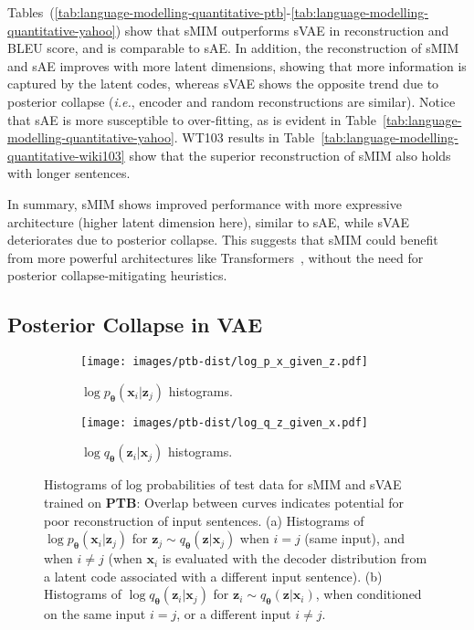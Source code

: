 \documentclass{article}
\newcommand{\bs}{\boldsymbol}
\newcommand{\ie}{{\em i.e.}}
\newcommand{\x}{{\bs{x}}}
\newcommand{\z}{{\bs z}}
\newcommand{\params}{{\bs \theta}}
\newcommand{\pdec}{p}
\newcommand{\penc}{q}
\newcommand{\Mdec}{\pdec_{\params}}
\newcommand{\Menc}{\penc_{\params}}
\begin{document}
Tables\ (\ref{tab:language-modelling-quantitative-ptb}-\ref{tab:language-modelling-quantitative-yahoo}) 
show that sMIM outperforms sVAE in reconstruction and BLEU score, and is comparable to sAE.
In addition, the reconstruction of sMIM and sAE improves with more latent dimensions, showing that more information is captured by the latent codes, 
whereas sVAE shows the opposite trend due to posterior collapse (\ie, encoder and random reconstructions are similar).
Notice that sAE is more susceptible to over-fitting, as is evident in Table\ \ref{tab:language-modelling-quantitative-yahoo}.
WT103 results in Table\ \ref{tab:language-modelling-quantitative-wiki103} show that the superior reconstruction of sMIM also holds with longer sentences.

In summary, sMIM shows improved performance with more expressive architecture (higher latent dimension here), 
similar to sAE, while sVAE deteriorates due to posterior collapse.
This suggests that sMIM could benefit from more powerful architectures like Transformers~\citep{Vaswani2017}, without the need for posterior collapse-mitigating heuristics.



\subsection{Posterior Collapse in VAE} \label{sec:nlp-posterior-collapse-ptb}

\begin{figure}[t]
    \centering
    \begin{subfigure}[t]{0.5\columnwidth}
        \centering
        \texttt{[image: images/ptb-dist/log\_p\_x\_given\_z.pdf]}
        \caption{$\log \Mdec(\x_i|\z_j)$ histograms.}     
        \label{fig:nlp-dist-ptb-log_p_x_given_z}
    \end{subfigure}\begin{subfigure}[t]{0.5\columnwidth}
        \centering
        \texttt{[image: images/ptb-dist/log\_q\_z\_given\_x.pdf]}
        \caption{$\log \Menc(\z_i|\x_j)$ histograms.}     
        \label{fig:nlp-dist-ptb-log_q_z_given_x}
    \end{subfigure}
     \vspace*{-0.25cm}
    \caption{
    Histograms of log probabilities of test data for sMIM  and 
    sVAE trained on \textbf{PTB}: Overlap between  curves indicates
    potential for poor reconstruction of input sentences.
    (a) Histograms of $\log \Mdec(\x_i|\z_j)$ for $\z_j \sim \Menc(\z|\x_j)$ when $i=j$ 
    (same input), and when $i\neq j$ (when $\x_i$ is evaluated with the 
    decoder distribution from a latent code associated with a different input sentence).
    (b) Histograms of $\log \Menc(\z_i |\x_j)$ for  $\z_i\sim\Menc(\z |\x_i)$, 
    when conditioned on the same input $i = j$, or a different input $i\neq j$.
    \label{fig:nlp-dist-ptb}
    }
    \vspace*{-0.5cm}
\end{figure}
\end{document}
